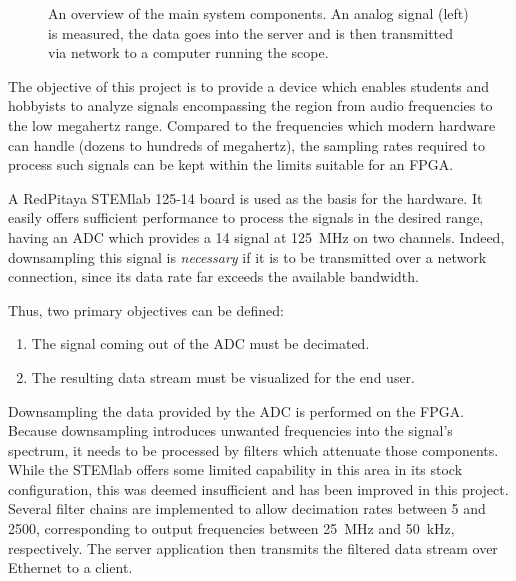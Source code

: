 \makeatletter
\renewcommand{\thefigure}{\@arabic\c@figure}
\makeatother
\begin{figure}
    \centering
    
    \caption[System Overview]{%
        An overview of the main system components.  An analog signal (left) is
        measured, the data  goes into the server  and is  then transmitted via
        network to a computer running the scope.%
    }
    \label{fig:intro:system_overview}
\end{figure}
\makeatletter
\renewcommand{\thefigure}{\thechapter.\@arabic\c@figure}
\makeatother

The  objective  of  this  project  is   to  provide  a  device  which  enables
students and hobbyists  to analyze signals encompassing the  region from audio
frequencies  to the  low megahertz  range. Compared to  the frequencies  which
modern hardware  can handle  (dozens to hundreds  of megahertz),  the sampling
rates required to process such signals  can be kept within the limits suitable
for an FPGA.

A RedPitaya  STEMlab 125-14 board  is used as  the basis for  the hardware. It
easily offers  sufficient performance  to process the  signals in  the desired
range, having an  ADC which provides a \SI{14}{\bit}  signal at \SI{125}{\MHz}
on two channels.   Indeed, downsampling this signal is  \emph{necessary} if it
is  to be  transmitted over  a  network connection,  since its  data rate  far
exceeds the available bandwidth.

Thus, two primary objectives can be defined:
\begin{enumerate}\tightlist
    \item
        The signal coming out of the ADC must be decimated.
    \item
        The resulting data stream must be visualized for the end user.
\end{enumerate}

Downsampling the  data provided by the  ADC is performed on  the FPGA. Because
downsampling introduces  unwanted frequencies  into the signal's  spectrum, it
needs  to be  processed  by filters  which  attenuate those  components. While
the  STEMlab  offers  some  limited  capability in  this  area  in  its  stock
configuration,  this was  deemed insufficient  and has  been improved  in this
project. Several  filter  chains are  implemented  to  allow decimation  rates
between \num{5}  and \num{2500},  corresponding to output  frequencies between
\SI{25}{\MHz}  and \SI{50}{\kHz},  respectively. The  server application  then
transmits the filtered data stream over Ethernet to a client.

